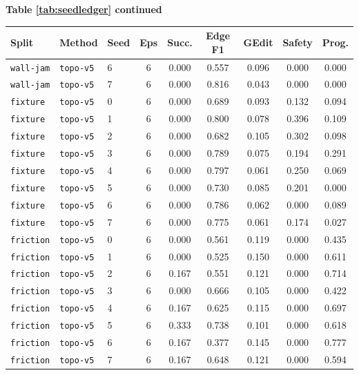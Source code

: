 \documentclass{article}
\begin{document}
\begin{center}
\textbf{Table \ref{tab:seedledger} continued}\\[0.4ex]
\begin{tabular}{lllcccccc}
\toprule
Split & Method & Seed & Eps & Succ. & Edge F1 & GEdit & Safety & Prog. \\
\midrule
\texttt{wall-jam} & \texttt{topo-v5} & 6 & 6 & 0.000 & 0.557 & 0.096 & 0.000 & 0.000 \\
\texttt{wall-jam} & \texttt{topo-v5} & 7 & 6 & 0.000 & 0.816 & 0.043 & 0.000 & 0.000 \\
\texttt{fixture} & \texttt{topo-v5} & 0 & 6 & 0.000 & 0.689 & 0.093 & 0.132 & 0.094 \\
\texttt{fixture} & \texttt{topo-v5} & 1 & 6 & 0.000 & 0.800 & 0.078 & 0.396 & 0.109 \\
\texttt{fixture} & \texttt{topo-v5} & 2 & 6 & 0.000 & 0.682 & 0.105 & 0.302 & 0.098 \\
\texttt{fixture} & \texttt{topo-v5} & 3 & 6 & 0.000 & 0.789 & 0.075 & 0.194 & 0.291 \\
\texttt{fixture} & \texttt{topo-v5} & 4 & 6 & 0.000 & 0.797 & 0.061 & 0.250 & 0.069 \\
\texttt{fixture} & \texttt{topo-v5} & 5 & 6 & 0.000 & 0.730 & 0.085 & 0.201 & 0.000 \\
\texttt{fixture} & \texttt{topo-v5} & 6 & 6 & 0.000 & 0.786 & 0.062 & 0.000 & 0.089 \\
\texttt{fixture} & \texttt{topo-v5} & 7 & 6 & 0.000 & 0.775 & 0.061 & 0.174 & 0.027 \\
\texttt{friction} & \texttt{topo-v5} & 0 & 6 & 0.000 & 0.561 & 0.119 & 0.000 & 0.435 \\
\texttt{friction} & \texttt{topo-v5} & 1 & 6 & 0.000 & 0.525 & 0.150 & 0.000 & 0.611 \\
\texttt{friction} & \texttt{topo-v5} & 2 & 6 & 0.167 & 0.551 & 0.121 & 0.000 & 0.714 \\
\texttt{friction} & \texttt{topo-v5} & 3 & 6 & 0.000 & 0.666 & 0.105 & 0.000 & 0.422 \\
\texttt{friction} & \texttt{topo-v5} & 4 & 6 & 0.167 & 0.625 & 0.115 & 0.000 & 0.697 \\
\texttt{friction} & \texttt{topo-v5} & 5 & 6 & 0.333 & 0.738 & 0.101 & 0.000 & 0.618 \\
\texttt{friction} & \texttt{topo-v5} & 6 & 6 & 0.167 & 0.377 & 0.145 & 0.000 & 0.777 \\
\texttt{friction} & \texttt{topo-v5} & 7 & 6 & 0.167 & 0.648 & 0.121 & 0.000 & 0.594 \\

\end{tabular}
\end{center}
\end{document}
